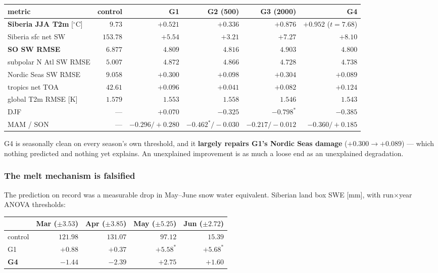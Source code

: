 \documentclass[10pt]{article}
\begin{document}
\begin{center}\footnotesize
\begin{tabular}{l r r r r r}
\toprule
metric & control & G1 & G2 (500) & G3 (2000) & \textbf{G4} \\
\midrule
\textbf{Siberia JJA T2m} [$^\circ$C] & $9.73$ & $+0.521$ & $+0.336$ & $+0.876$ & $\mathbf{+0.952}$ ($t{=}7.68$) \\
Siberia sfc net SW & $153.78$ & $+5.54$ & $+3.21$ & $+7.27$ & $\mathbf{+8.10}$ \\
\textbf{SO SW RMSE} & $6.877$ & $4.809$ & $4.816$ & $4.903$ & $\mathbf{4.800}$ \\
subpolar N Atl SW RMSE & $5.007$ & $4.872$ & $4.866$ & $4.728$ & $\mathbf{4.738}$ \\
Nordic Seas SW RMSE & $9.058$ & $+0.300$ & $+0.098$ & $+0.304$ & $\mathbf{+0.089}$ \\
tropics net TOA & $42.61$ & $+0.096$ & $+0.041$ & $+0.082$ & $+0.124$ \\
global T2m RMSE [K] & $1.579$ & $1.553$ & $1.558$ & $1.546$ & $\mathbf{1.543}$ \\
DJF & --- & $+0.070$ & $-0.325$ & $\mathbf{-0.798}^{*}$ & $-0.385$ \\
MAM / SON & --- & $-0.296/{+}0.280$ & $-0.462^{*}/{-}0.030$ & $-0.217/{-}0.012$ & $-0.360/{+}0.185$ \\
\bottomrule
\end{tabular}
\end{center}

\noindent G4 is seasonally clean on every season's own threshold, and it
\textbf{largely repairs G1's Nordic Seas damage} ($+0.300 \to +0.089$) --- which nothing
predicted and nothing yet explains. An unexplained improvement is as much a loose end as an
unexplained degradation.

\subsubsection*{The melt mechanism is falsified}
The prediction on record was a measurable drop in May--June snow water equivalent. Siberian
land box SWE [mm], with run$\times$year ANOVA thresholds:

\begin{center}\footnotesize
\begin{tabular}{l r r r r}
\toprule
 & Mar ($\pm3.53$) & Apr ($\pm3.85$) & May ($\pm5.25$) & Jun ($\pm2.72$) \\
\midrule
control & $121.98$ & $131.07$ & $97.12$ & $15.39$ \\
G1 & $+0.88$ & $+0.37$ & $\mathbf{+5.58}^{*}$ & $\mathbf{+5.68}^{*}$ \\
\textbf{G4} & $-1.44$ & $-2.39$ & $+2.75$ & $+1.60$ \\
\bottomrule
\end{tabular}
\end{center}
\end{document}
